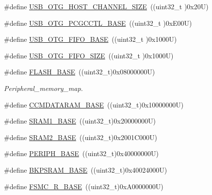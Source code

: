 \begin{DoxyCompactItemize}
\item 
\#define \hyperlink{group___peripheral__registers__structures_ga266cb1dbb50faf447f9c15d2ee93a522}{U\+S\+B\+\_\+\+O\+T\+G\+\_\+\+H\+O\+S\+T\+\_\+\+C\+H\+A\+N\+N\+E\+L\+\_\+\+S\+I\+ZE}~((uint32\+\_\+t )0x20\+U)
\item 
\#define \hyperlink{group___peripheral__registers__structures_gaa9766975aca084c257730879568bc7cf}{U\+S\+B\+\_\+\+O\+T\+G\+\_\+\+P\+C\+G\+C\+C\+T\+L\+\_\+\+B\+A\+SE}~((uint32\+\_\+t )0x\+E00\+U)
\item 
\#define \hyperlink{group___peripheral__registers__structures_gace340350802904868673f0e839c4fa04}{U\+S\+B\+\_\+\+O\+T\+G\+\_\+\+F\+I\+F\+O\+\_\+\+B\+A\+SE}~((uint32\+\_\+t )0x1000\+U)
\item 
\#define \hyperlink{group___peripheral__registers__structures_ga8781c4b2406c740d9fe540737a6a0188}{U\+S\+B\+\_\+\+O\+T\+G\+\_\+\+F\+I\+F\+O\+\_\+\+S\+I\+ZE}~((uint32\+\_\+t )0x1000\+U)
\item 
\#define \hyperlink{group___peripheral__registers__structures_ga23a9099a5f8fc9c6e253c0eecb2be8db}{F\+L\+A\+S\+H\+\_\+\+B\+A\+SE}~((uint32\+\_\+t)0x08000000\+U)
\begin{DoxyCompactList}\small\item\em Peripheral\+\_\+memory\+\_\+map. \end{DoxyCompactList}\item 
\#define \hyperlink{group___peripheral__registers__structures_gabea1f1810ebeac402164b42ab54bcdf9}{C\+C\+M\+D\+A\+T\+A\+R\+A\+M\+\_\+\+B\+A\+SE}~((uint32\+\_\+t)0x10000000\+U)
\item 
\#define \hyperlink{group___peripheral__registers__structures_ga7d0fbfb8894012dbbb96754b95e562cd}{S\+R\+A\+M1\+\_\+\+B\+A\+SE}~((uint32\+\_\+t)0x20000000\+U)
\item 
\#define \hyperlink{group___peripheral__registers__structures_gadbb42a3d0a8a90a79d2146e4014241b1}{S\+R\+A\+M2\+\_\+\+B\+A\+SE}~((uint32\+\_\+t)0x2001\+C000\+U)
\item 
\#define \hyperlink{group___peripheral__registers__structures_ga9171f49478fa86d932f89e78e73b88b0}{P\+E\+R\+I\+P\+H\+\_\+\+B\+A\+SE}~((uint32\+\_\+t)0x40000000\+U)
\item 
\#define \hyperlink{group___peripheral__registers__structures_ga52e57051bdf8909222b36e5408a48f32}{B\+K\+P\+S\+R\+A\+M\+\_\+\+B\+A\+SE}~((uint32\+\_\+t)0x40024000\+U)
\item 
\#define \hyperlink{group___peripheral__registers__structures_gaddf0e199dccba83272b20c9fb4d3aaed}{F\+S\+M\+C\+\_\+\+R\+\_\+\+B\+A\+SE}~((uint32\+\_\+t)0x\+A0000000\+U)

\end{DoxyCompactItemize}
